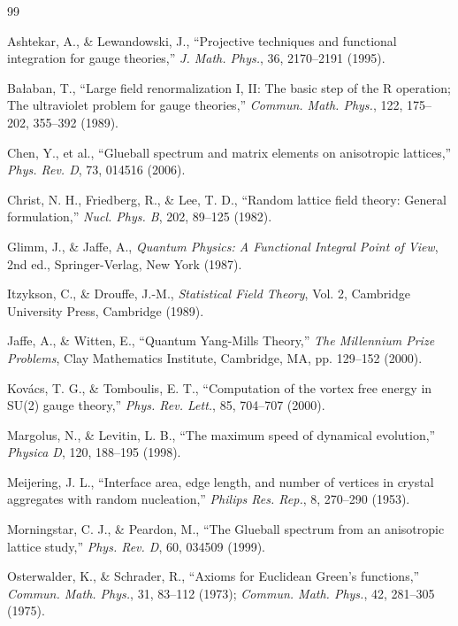 \documentclass[11pt, a4paper]{article}
\theoremstyle{definition}
\theoremstyle{remark}
\begin{document}
\begin{thebibliography}{99}

Ashtekar, A., \& Lewandowski, J., ``Projective techniques and functional integration for gauge theories,'' \textit{J. Math. Phys.}, 36, 2170--2191 (1995).

Ba\l{}aban, T., ``Large field renormalization I, II: The basic step of the R operation; The ultraviolet problem for gauge theories,'' \textit{Commun. Math. Phys.}, 122, 175--202, 355--392 (1989).

Chen, Y., et al., ``Glueball spectrum and matrix elements on anisotropic lattices,'' \textit{Phys. Rev. D}, 73, 014516 (2006).

Christ, N. H., Friedberg, R., \& Lee, T. D., ``Random lattice field theory: General formulation,'' \textit{Nucl. Phys. B}, 202, 89--125 (1982).

Glimm, J., \& Jaffe, A., \textit{Quantum Physics: A Functional Integral Point of View}, 2nd ed., Springer-Verlag, New York (1987).

Itzykson, C., \& Drouffe, J.-M., \textit{Statistical Field Theory}, Vol. 2, Cambridge University Press, Cambridge (1989).

Jaffe, A., \& Witten, E., ``Quantum Yang-Mills Theory,'' \textit{The Millennium Prize Problems}, Clay Mathematics Institute, Cambridge, MA, pp. 129--152 (2000).

Kov\'acs, T. G., \& Tomboulis, E. T., ``Computation of the vortex free energy in SU(2) gauge theory,'' \textit{Phys. Rev. Lett.}, 85, 704--707 (2000).

Margolus, N., \& Levitin, L. B., ``The maximum speed of dynamical evolution,'' \textit{Physica D}, 120, 188--195 (1998).

Meijering, J. L., ``Interface area, edge length, and number of vertices in crystal aggregates with random nucleation,'' \textit{Philips Res. Rep.}, 8, 270--290 (1953).

Morningstar, C. J., \& Peardon, M., ``The Glueball spectrum from an anisotropic lattice study,'' \textit{Phys. Rev. D}, 60, 034509 (1999).

Osterwalder, K., \& Schrader, R., ``Axioms for Euclidean Green's functions,'' \textit{Commun. Math. Phys.}, 31, 83--112 (1973); \textit{Commun. Math. Phys.}, 42, 281--305 (1975).


\end{thebibliography}
\end{document}
